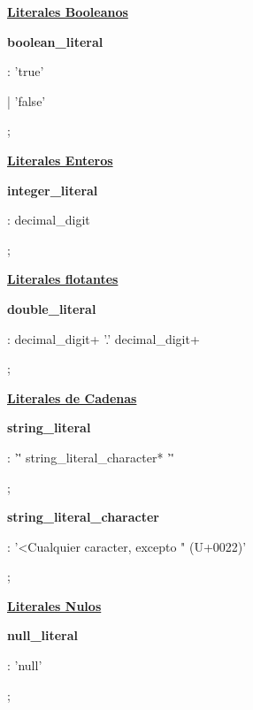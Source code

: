 		\underline{\textbf{Literales Booleanos}}\par
		\textbf{boolean\_literal}\par
		: 'true'\par
		| 'false'\par
		;\par
		
		\underline{\textbf{Literales Enteros}}\par
		\textbf{integer\_literal}\par
		: decimal\_digit\par
		;\par
		
		\underline{\textbf{Literales flotantes}}\par
		\textbf{double\_literal}\par
		: decimal\_digit+ '.' decimal\_digit+\par
		;\par
		
		\underline{\textbf{Literales de Cadenas}}\par
		\textbf{string\_literal}\par
		: '\"' string\_literal\_character* '\"'\par
		;\par
		
		\textbf{string\_literal\_character}\par
		: '<Cualquier caracter, excepto " (U+0022)'\par
		;\par
		
		\underline{\textbf{Literales Nulos}}\par
		\textbf{null\_literal}\par
		: 'null'\par
		;\par
		
